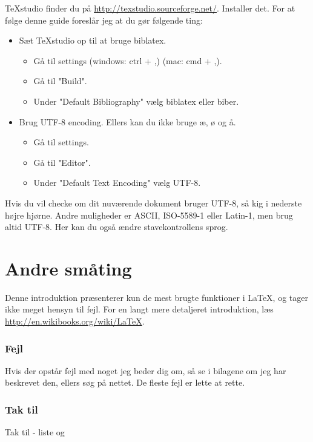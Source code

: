 TeXstudio finder du på \url{http://texstudio.sourceforge.net/}. Installer det. For at følge denne guide foreslår jeg at du gør følgende ting:
\begin{itemize}
\item Sæt TeXstudio op til at bruge biblatex.
\begin{itemize}
\item Gå til settings (windows: ctrl + ,) (mac: cmd + ,).
\item Gå til "Build".
\item Under "Default Bibliography" vælg biblatex eller biber.
\end{itemize}
\item Brug UTF-8 encoding. Ellers kan du ikke bruge æ, ø og å.
\begin{itemize}
\item Gå til settings.
\item Gå til "Editor".
\item Under "Default Text Encoding" vælg UTF-8.
\end{itemize}
\end{itemize}

Hvis du vil checke om dit nuværende dokument bruger UTF-8, så kig i nederste højre hjørne. Andre muligheder er ASCII, ISO-5589-1 eller Latin-1, men brug altid UTF-8. Her kan du også ændre stavekontrollens sprog.

\section{Andre småting}
Denne introduktion præsenterer kun de mest brugte funktioner i LaTeX, og tager ikke meget hensyn til fejl. For en langt mere detaljeret introduktion, læs \url{http://en.wikibooks.org/wiki/LaTeX}.

\subsubsection{Fejl}
Hvis der opstår fejl med noget jeg beder dig om, så se i bilagene om jeg har beskrevet den, ellers søg på nettet. De fleste fejl er lette at rette.

\subsubsection{Tak til}
Tak til - liste og 
